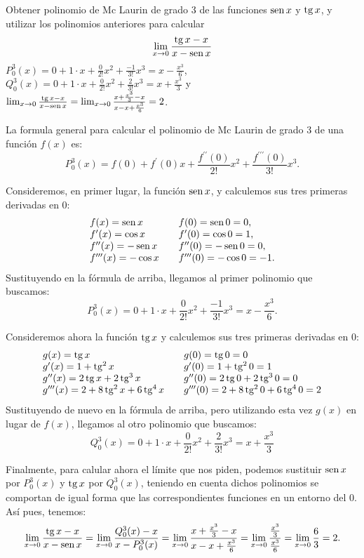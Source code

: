 {Obtener polinomio de Mc Laurin de grado 3 de las funciones $\operatorname{sen} x$ y $\operatorname{tg} x$, y utilizar los polinomios anteriores para calcular
\[
\lim_{x\rightarrow 0}\frac{\operatorname{tg} x-x}{x-\operatorname{sen} x}
\]
}
{$P_{0}^{3}(x)=0+1\cdot x+\frac{0}{2!}x^{2}+\frac{-1}{3!}x^{3}=x-\frac{x^{3}}{6}$,\\
$Q_{0}^{3}(x)=0+1\cdot x+\frac{0}{2!}x^{2}+\frac{2}{3!}x^{3}=x+\frac{x^{3}}{3}$ y \\
$\lim_{x\rightarrow 0}\frac{\operatorname{tg} x-x}{x-\operatorname{sen} x} = \lim_{x\rightarrow 0}\frac{x+\frac{x^{3}}{3}-x}{x-x+\frac{x^{3}}{6}} =2$.
}
{La formula general para calcular el polinomio de Mc Laurin de grado 3 de una función $f(x)$ es:
\[
P_{0}^{3}(x)=f(0)+f^{\prime }(0)x+\frac{f^{\prime \prime }(0)}{2!}x^{2}+\frac{f^{\prime \prime \prime }(0)}{3!}x^{3}.
\]

Consideremos, en primer lugar, la función $\operatorname{sen} x$, y calculemos sus tres primeras derivadas en 0:
\[
\begin{array}{lll}
f(x)=\operatorname{sen} x &  & f(0)=\operatorname{sen} 0=0, \\
f^{\prime }(x)=\cos x &  & f^{\prime }(0)=\cos 0=1, \\
f^{\prime \prime }(x)=-\operatorname{sen} x &  & f^{\prime \prime }(0)=-\operatorname{sen}0=0, \\
f^{\prime \prime \prime }(x)=-\cos x &  & f^{\prime \prime \prime }(0)=-\cos 0=-1.
\end{array}
\]
Sustituyendo en la fórmula de arriba, llegamos al primer polinomio que buscamos:
\[
P_{0}^{3}(x)=0+1\cdot x+\frac{0}{2!}x^{2}+\frac{-1}{3!}x^{3}=x-\frac{x^{3}}{6}.
\]

Consideremos ahora la función $\operatorname{tg} x$ y calculemos sus tres primeras derivadas en 0:
\[
\begin{array}{lll}
g(x)=\operatorname{tg} x &  & g(0)=\operatorname{tg} 0=0 \\
g^{\prime }(x)=1+\operatorname{tg}^{2} x &  & g^{\prime }(0)=1+\operatorname{tg}^{2} 0=1 \\
g^{\prime \prime }(x)= 2\operatorname{tg} x+2\operatorname{tg} ^{3}x &  & g^{\prime \prime}(0)= 2\operatorname{tg} 0+2\operatorname{tg} ^{3}0=0 \\
g^{\prime \prime \prime }(x)=2+ 8\operatorname{tg} ^{2}x+6\operatorname{tg} ^{4}x &  & g^{\prime \prime \prime }(0)= 2+ 8\operatorname{tg} ^{2}0+6\operatorname{tg} ^{4}0=2
\end{array}
\]
Sustituyendo de nuevo en la fórmula de arriba, pero utilizando esta vez $g(x)$ en lugar de $f(x)$, llegamos al otro polinomio que buscamos:
\[
Q_{0}^{3}(x)=0+1\cdot x+\frac{0}{2!}x^{2}+\frac{2}{3!}x^{3}=x+\frac{x^{3}}{3}
\]

Finalmente, para calular ahora el límite que nos piden, podemos sustituir $\operatorname{sen} x$ por $P_{0}^{3}(x)$ y $\operatorname{tg} x$ por $Q_{0}^{3}(x)$, teniendo en cuenta dichos polinomios se comportan de igual forma que las correspondientes funciones en un entorno del 0. Así pues, tenemos:
\[
\lim_{x\rightarrow 0}\frac{\operatorname{tg} x-x}{x-\operatorname{sen} x} = \lim_{x\rightarrow 0}\frac{Q_{0}^{3}(x)-x}{x-P_{0}^{3}(x)} = \lim_{x\rightarrow 0}\frac{x+\frac{x^{3}}{3}-x}{x-x+\frac{x^{3}}{6}} = \lim_{x\rightarrow 0}\frac{\frac{x^{3}}{3}}{\frac{x^{3}}{6}} = \lim_{x\rightarrow 0}\frac{6}{3}=2.
\]
}


